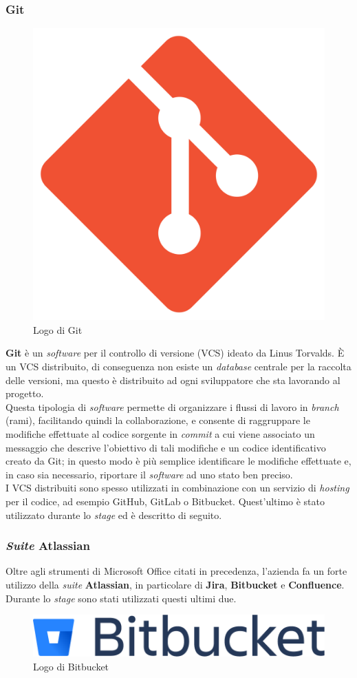 \subsubsection{Git}

\begin{figure}[H]
    \centering 
    \includegraphics[width=0.2\columnwidth]{images/loghi/Git.png} 
    \caption{Logo di Git}
\end{figure}

\noindent \textbf{Git} è un \textit{software} per il controllo di versione (VCS) ideato da Linus Torvalds. È un VCS distribuito, di conseguenza non esiste un \textit{database} centrale per la raccolta delle versioni, ma questo è distribuito ad ogni sviluppatore che sta lavorando al progetto.\\
Questa tipologia di \textit{software} permette di organizzare i flussi di lavoro in \textit{branch} (rami), facilitando quindi la collaborazione, e consente di raggruppare le modifiche effettuate al codice sorgente in \textit{commit} a cui viene associato un messaggio che descrive l'obiettivo di tali modifiche e un codice identificativo creato da Git; in questo modo è più semplice identificare le modifiche effettuate e, in caso sia necessario, riportare il \textit{software} ad uno stato ben preciso.\\
I VCS distribuiti sono spesso utilizzati in combinazione con un servizio di \textit{hosting} per il codice, ad esempio GitHub, GitLab o Bitbucket. Quest'ultimo è stato utilizzato durante lo \textit{stage} ed è descritto di seguito.


\subsubsection{\textit{Suite} Atlassian}

Oltre agli strumenti di Microsoft Office citati in precedenza, l'azienda fa un forte utilizzo della \textit{suite} \textbf{Atlassian}, in particolare di \textbf{Jira}, \textbf{Bitbucket} e \textbf{Confluence}. Durante lo \textit{stage} sono stati utilizzati questi ultimi due.

\vspace{6mm}

\begin{figure}[H]
    \centering 
    \includegraphics[width=0.4\columnwidth]{images/loghi/bitbucket.png} 
    \caption{Logo di Bitbucket}
\end{figure}

